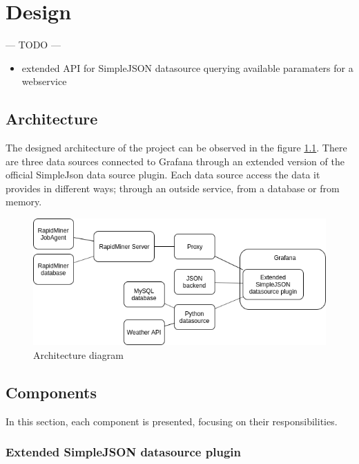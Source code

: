 \chapter{Design}

\begin{center}
	--- TODO ---
	\begin{itemize}
		\item extended API for SimpleJSON datasource
		\subitem querying available paramaters for a webservice
	\end{itemize}
\end{center}

\section{Architecture}

The designed architecture of the project can be observed in the figure \ref{fig:arch}. There are three data sources connected to Grafana through an extended version of the official SimpleJson data source plugin. Each data source access the data it provides in different ways; through an outside service, from a database or from memory.

\begin{figure}[h]
	\centering
	\includegraphics[width=150mm, keepaspectratio]{figures/architecture.png}
	\caption{Architecture diagram}
	\label{fig:arch}
\end{figure}

\section{Components}

In this section, each component is presented, focusing on their responsibilities.

\subsection{Extended SimpleJSON datasource plugin}

